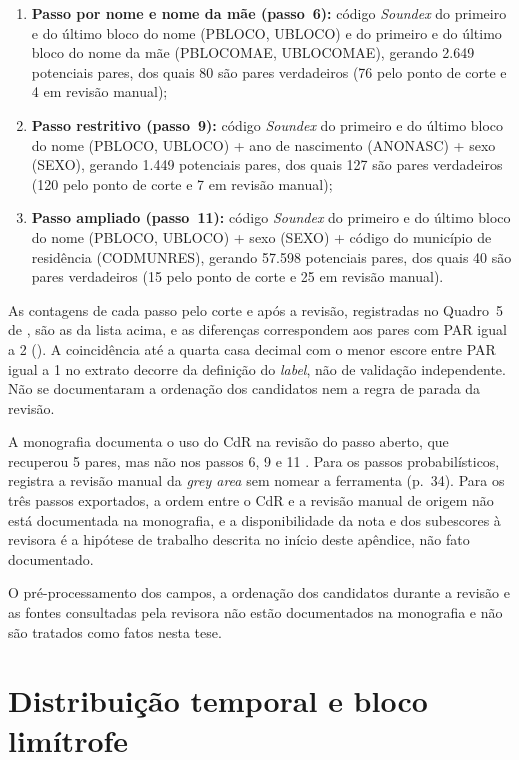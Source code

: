 \begin{enumerate}
\item \textbf{Passo por nome e nome da mãe (passo~6):} código \textit{Soundex} do primeiro e do último bloco do nome (PBLOCO, UBLOCO) e do primeiro e do último bloco do nome da mãe (PBLOCOMAE, UBLOCOMAE), gerando 2.649 potenciais pares, dos quais 80 são pares verdadeiros (76 pelo ponto de corte e 4 em revisão manual);
\item \textbf{Passo restritivo (passo~9):} código \textit{Soundex} do primeiro e do último bloco do nome (PBLOCO, UBLOCO) + ano de nascimento (ANONASC) + sexo (SEXO), gerando 1.449 potenciais pares, dos quais 127 são pares verdadeiros (120 pelo ponto de corte e 7 em revisão manual);
\item \textbf{Passo ampliado (passo~11):} código \textit{Soundex} do primeiro e do último bloco do nome (PBLOCO, UBLOCO) + sexo (SEXO) + código do município de residência (CODMUNRES), gerando 57.598 potenciais pares, dos quais 40 são pares verdadeiros (15 pelo ponto de corte e 25 em revisão manual).
\end{enumerate}

As contagens de cada passo pelo corte e após a revisão, registradas no Quadro~5 de , são as da lista acima, e as diferenças correspondem aos pares com PAR igual a 2 (). A coincidência até a quarta casa decimal com o menor escore entre PAR igual a 1 no extrato decorre da definição do \textit{label}, não de validação independente. Não se documentaram a ordenação dos candidatos nem a regra de parada da revisão.

A monografia documenta o uso do CdR na revisão do passo aberto, que recuperou 5 pares, mas não nos passos 6, 9 e 11 \cite[p.~39; Quadro~6]{Oliveira2026obitoTBpulmonar}. Para os passos probabilísticos, registra a revisão manual da \textit{grey area} sem nomear a ferramenta (p.~34). Para os três passos exportados, a ordem entre o CdR e a revisão manual de origem não está documentada na monografia, e a disponibilidade da nota e dos subescores à revisora é a hipótese de trabalho descrita no início deste apêndice, não fato documentado.

O pré-processamento dos campos, a ordenação dos candidatos durante a revisão e as fontes consultadas pela revisora não estão documentados na monografia e não são tratados como fatos nesta tese.

\section{Distribuição temporal e bloco limítrofe}\label{sec:ap-origem-temporal}

